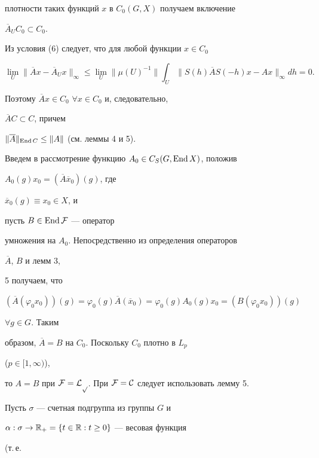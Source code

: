 \begin{pf}
плотности таких функций $x$ в $C_0(G,X)$ получаем включение 


$\overline A_UC_0\subset C_0$. 


 


Из условия (6) следует, что для любой функции $x\in C_0$ 


$$ 


\lim_U\|\overline Ax-\overline A_Ux\|_\infty \le 


\lim_U\|\mu(U)^{-1}\|\int_U\|S(h)\overline AS(-h)x-Ax\|_\infty 


dh=0. 


$$ 


Поэтому $\overline Ax\in C_0$ $\forall x\in C_0$ и, следовательно, 


$\overline AC\subset C$, причем 


$\|\overline A\|_{\operatorname{End} C}\le \|A\|$ (см. леммы 4 и 5). 


 


Введем в рассмотрение функцию $A_0\in C_S(G,\operatorname{End} X)$, положив 


$A_0(g)x_0=(\overline A\overline x_0)(g)$, где 


$\overline x_0(g)\equiv x_0\in X$, и 


пусть $B\in\operatorname{End}\cal F$ --- оператор 


умножения на $A_0$. Непосредственно из определения операторов 


$\overline A$, $B$ и лемм 3, 


5 получаем, что 


$(\overline A(\varphi_0x_0))(g)=\varphi_0(g)\overline A 


(\overline x_0)=\varphi_0(g)A_0(g)x_0=(B(\varphi_0x_0))(g)$ 


$\forall g\in G$. Таким 


образом, $\overline A=B$ на $C_0$. Поскольку $C_0$ плотно в $L_p$ 


($p\in[1,\infty)$), 


то $A=B$ при $\cal F=L_p$. При $\cal F=C$ следует использовать лемму 5. 


\end{pf} 


 


Пусть $\sigma$ --- счетная подгруппа из группы $G$ и 


$\alpha:\sigma\to\Bbb R_+=\{t\in\Bbb R:t\ge 0\}$ --- весовая функция 


(т.\,е. 



